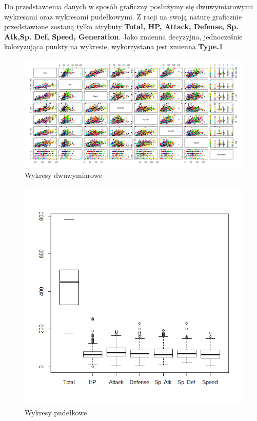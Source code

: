 \documentclass{article}
\begin{document}
Do przedstawienia danych w sposób graficzny posłużymy się dwuwymiarowymi wykresami oraz wykresami pudełkowymi. Z racji na swoją naturę graficznie przedstawione zostaną tylko atrybuty \textbf{Total, HP, Attack, Defense, Sp. Atk,Sp. Def, Speed, Generation}. Jako zmienna decyzyjna, jednocześnie koloryzująca punkty na wykresie, wykorzystana jest zmienna \textbf{Type.1}
\begin{figure}[H]
	\caption{Wykresy dwuwymiarowe}
	\begin{center}
	\includegraphics[width=1\columnwidth]{obrazki/graph} %
	\end{center}
\end{figure}
\begin{figure}[H]
	\caption{Wykresy pudełkowe}
	\begin{center}
	\includegraphics[width=0.75\columnwidth]{obrazki/boxplot} %
	\end{center}
\end{figure}
\end{document}
